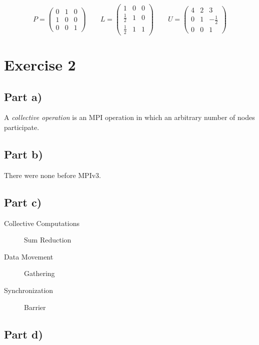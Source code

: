 \documentclass[10pt,a4paper]{article}
\begin{document}
\begin{equation*}
  P = \begin{pmatrix}
    0 & 1 & 0\\
    1 & 0 & 0\\
    0 & 0 & 1
  \end{pmatrix}
  \qquad
  L = \begin{pmatrix}
    1 & 0 & 0\\
    \frac{1}{2} & 1 & 0\\
    \frac{1}{2} & 1 & 1
  \end{pmatrix}
  \qquad
  U = \begin{pmatrix}
    4 & 2 & 3\\
    0 & 1 & -\frac{1}{2}\\
    0 & 0 & 1
  \end{pmatrix}
\end{equation*}

\section*{Exercise 2}

\subsection*{Part a)}

A \emph{collective operation} is an MPI operation in which an arbitrary number of nodes participate.

\subsection*{Part b)}

There were none before MPIv3.

\subsection*{Part c)}

\begin{description}
\item[Collective Computations] Sum Reduction
\item[Data Movement] Gathering
\item[Synchronization] Barrier
\end{description}

\subsection*{Part d)}
\end{document}
